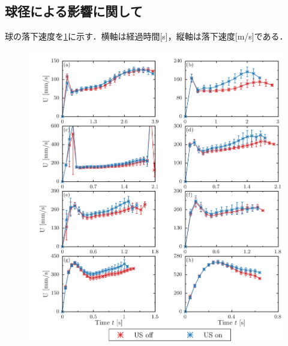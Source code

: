 \newpage

\subsection{球径による影響に関して}

球の落下速度を\ref{fig:diameter}に示す．横軸は経過時間[s]，縦軸は落下速度[m/s]である．

\begin{figure}[h]
    \centering
    \includegraphics[width=1.0\textwidth]{X-Appendix/diameter/diameter.png}
    \caption{} %
    \label{fig:diameter}
\end{figure}
